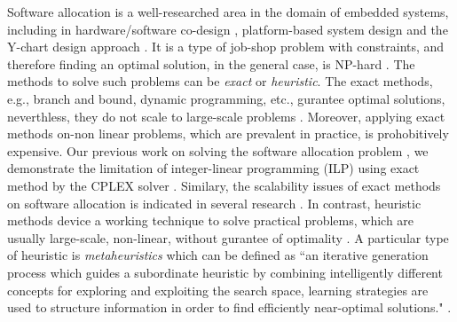 Software allocation is a well-researched area in the domain of embedded systems, including in hardware/software co-design \cite{Wolf2003ACodesign}, platform-based system design \cite{Sangiovanni-Vincentelli2004BenefitsDesign} and the Y-chart design approach \cite{ychart_Kienhuis2002}. It is a type of job-shop problem with constraints, and therefore finding an optimal solution, in the general case, is  NP-hard \cite{Fernandez-Baca1989AllocatingSystem}. The methods to solve such problems can be \textit{exact} or \textit{heuristic}. The exact methods, e.g., branch and bound, dynamic programming, etc., gurantee optimal solutions, neverthless, they do not scale to large-scale problems \cite{Saidi2015AnArchitectures}. Moreover, applying exact methods on-non linear problems, which are prevalent in practice, is prohobitively expensive. Our previous work on solving the software allocation problem \cite{Mahmud5222}, we demonstrate the limitation of integer-linear programming (ILP) \cite{Bradley1977AppliedProgramming} using exact method by the CPLEX solver . Similary, the scalability issues of exact methods on software allocation is indicated in several research \cite{Saidi2015AnArchitectures}. In contrast, heuristic methods device a working technique to solve practical problems, which are usually large-scale, non-linear, without gurantee of optimality \cite{faragardi2018AECUs,Bucaioni2018MoVES:Systems}.  A particular type of heuristic is \textit{metaheuristics} which can be defined as ``an iterative generation process which guides a subordinate heuristic by combining intelligently different concepts for exploring and exploiting the search space, learning strategies are used to structure information in order to
find efficiently near-optimal solutions." \cite{Osman2005}.

